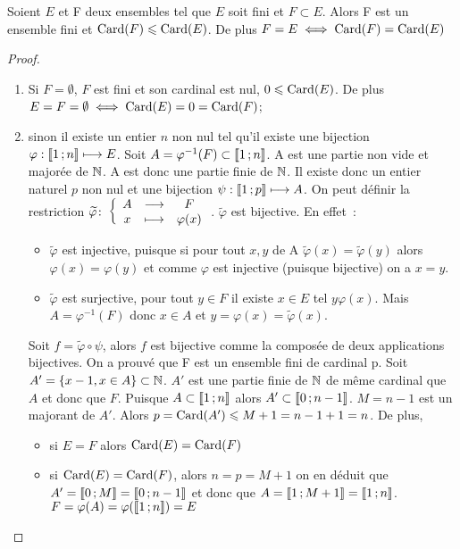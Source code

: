 \begin{theo}\label{theo:partiesfinies}
  Soient $E$ et F deux ensembles tel que $E$ soit fini et $F\subset E$. Alors F est un ensemble fini et $\operatorname{Card}(F)\leqslant\operatorname{Card}(E)$. De plus $F=E \iff \operatorname{Card}(F)=\operatorname{Card}(E)$
\end{theo}
\begin{proof}
  \begin{enumerate}
  \item Si $F=\emptyset$, $F$ est fini et son cardinal est nul, $0\leqslant\operatorname{Card}(E)$. De plus $E=F=\emptyset \iff \operatorname{Card}(E)=0=\operatorname{Card}(F)$;
  \item sinon il existe un entier $n$ non nul tel qu'il existe une bijection $\varphi:\mathopen{\llbracket}1\mathclose{}\mathpunct{};n\mathclose{\rrbracket} \longmapsto E$. Soit $A=\varphi^{-1}(F) \subset\mathopen{\llbracket}1\mathclose{}\mathpunct{};n\mathclose{\rrbracket}$. A est une partie non vide et majorée de $\mathbb{N}$. A est donc une partie finie de $\mathbb{N}$. Il existe donc un entier naturel $p$ non nul et une bijection $\psi:\mathopen{\llbracket}1\mathclose{}\mathpunct{};p\mathclose{\rrbracket} \longmapsto A$. On peut définir la restriction $\widetilde{\varphi}\colon \left\{\begin{array}{ccc} A & \longrightarrow &F\\ x & \longmapsto & \varphi(x) \end{array} \right.$. $\widetilde{\varphi}$ est bijective. En effet~:
    \begin{itemize}
    \item $\widetilde{\varphi}$ est injective, puisque si pour tout $x,y$ de A $\widetilde{\varphi}(x)=\widetilde{\varphi}(y)$ alors $\varphi(x)=\varphi(y)$ et comme $\varphi$ est injective (puisque bijective) on a $x=y$.
    \item $\widetilde{\varphi}$ est surjective, pour tout $y\in F$ il existe $x\in E$ tel $y\varphi(x)$. Mais $A=\varphi^{-1}(F)$ donc $x\in A$ et $y=\varphi(x)=\widetilde{\varphi}(x)$.
    \end{itemize}
    Soit $f=\widetilde{\varphi}\circ \psi$, alors $f$ est bijective comme la composée de deux applications bijectives. On a prouvé que F est un ensemble fini de cardinal p. Soit $A'=\{x-1, x\in A\}\subset \mathbb{N}$. $A'$ est une partie finie de $\mathbb{N}$ de même cardinal que $A$ et donc que $F$. Puisque $A\subset\mathopen{\llbracket}1\mathclose{}\mathpunct{};n\mathclose{\rrbracket}$ alors $A'\subset\mathopen{\llbracket}0\mathclose{}\mathpunct{};n-1\mathclose{\rrbracket}$. $M=n-1$ est un majorant de $A'$. Alors $p=\operatorname{Card}(A')\leqslant M+1=n-1+1=n$. De plus, 
    \begin{itemize}
    \item si $E=F$ alors $\operatorname{Card}(E)=\operatorname{Card}(F)$
    \item si $\operatorname{Card}(E)=\operatorname{Card}(F)$, alors $n=p=M+1$ on en déduit que $A'=\mathopen{\llbracket}0\mathclose{}\mathpunct{};M\mathclose{\rrbracket} = \mathopen{\llbracket}0\mathclose{}\mathpunct{};n-1\mathclose{\rrbracket}$ et donc que $A=\mathopen{\llbracket}1\mathclose{}\mathpunct{};M+1\mathclose{\rrbracket} = \mathopen{\llbracket}1\mathclose{}\mathpunct{};n\mathclose{\rrbracket}$. $F=\varphi(A)=\varphi(\mathopen{\llbracket}1\mathclose{}\mathpunct{};n\mathclose{\rrbracket})=E$
    \end{itemize}
  \end{enumerate}
\end{proof}

